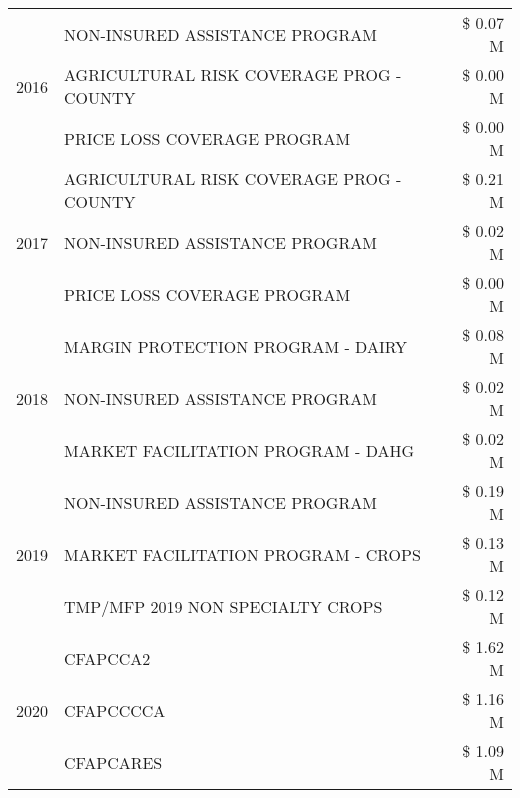\begin{tabular}{llr}
\cline{1-3}
\multirow[t]{3}{*}{2016} & NON-INSURED ASSISTANCE PROGRAM & \$ 0.07 M \\
 & AGRICULTURAL RISK COVERAGE PROG - COUNTY & \$ 0.00 M \\
 & PRICE LOSS COVERAGE PROGRAM & \$ 0.00 M \\
\cline{1-3}
\multirow[t]{3}{*}{2017} & AGRICULTURAL RISK COVERAGE PROG - COUNTY & \$ 0.21 M \\
 & NON-INSURED ASSISTANCE PROGRAM & \$ 0.02 M \\
 & PRICE LOSS COVERAGE PROGRAM & \$ 0.00 M \\
\cline{1-3}
\multirow[t]{3}{*}{2018} & MARGIN PROTECTION PROGRAM - DAIRY & \$ 0.08 M \\
 & NON-INSURED ASSISTANCE PROGRAM & \$ 0.02 M \\
 & MARKET FACILITATION PROGRAM - DAHG & \$ 0.02 M \\
\cline{1-3}
\multirow[t]{3}{*}{2019} & NON-INSURED ASSISTANCE PROGRAM & \$ 0.19 M \\
 & MARKET FACILITATION PROGRAM - CROPS & \$ 0.13 M \\
 & TMP/MFP 2019 NON SPECIALTY CROPS & \$ 0.12 M \\
\cline{1-3}
\multirow[t]{3}{*}{2020} & CFAPCCA2 & \$ 1.62 M \\
 & CFAPCCCCA & \$ 1.16 M \\
 & CFAPCARES & \$ 1.09 M \\
\cline{1-3}
\bottomrule
\end{tabular}
